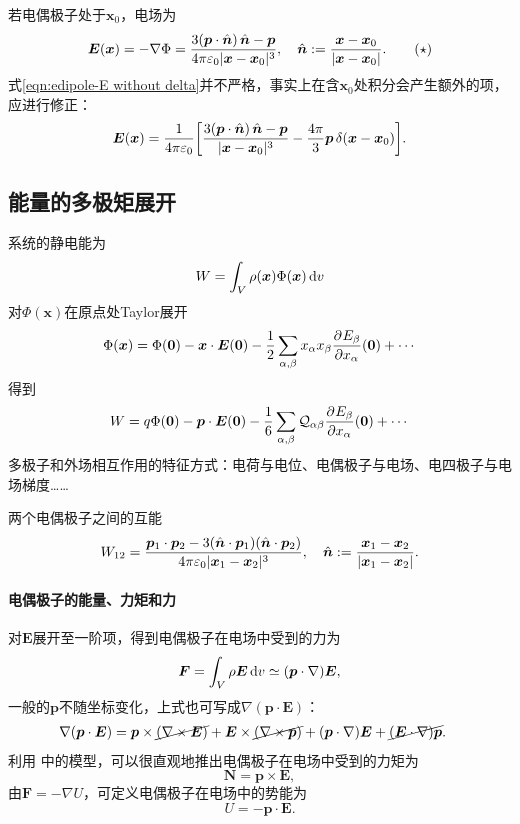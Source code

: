 若电偶极子处于$\bm x_0$，电场为 
\begin{equation}
    \label{eqn:edipole-E without delta}
    \bm E(\bm x)=-\nabla\Phi=\frac{3(\bm p\cdot\mathop{}\!\hat{\bm{n}})\mathop{}\!\hat{\bm{n}}-\bm p}{4\pi\varepsilon_0|\bm x-\bm x_0|^3},\quad \mathop{}\!\hat{\bm{n}}:=\frac{\bm x-\bm x_0}{|\bm x-\bm x_0|}.
    \tag{$\star$}
\end{equation}
式\eqref{eqn:edipole-E without delta}并不严格，事实上在含$\bm x_0$处积分会产生额外的项，应进行修正：
\begin{equation}
    \label{eqn:edipole-E with delta}
    \bm E(\bm x)=\frac1{4\pi\varepsilon_0}\biggl[\frac{3(\bm p\cdot\mathop{}\!\hat{\bm{n}})\mathop{}\!\hat{\bm{n}}-\bm p}{|\bm x-\bm x_0|^3}-\frac{4\pi}3\bm p\mathop{}\!\delta(\bm x-\bm x_0)\biggr].
\end{equation}

\subsection{能量的多极矩展开}
\label{ssec:multipole expansion of energy}

系统的静电能为
\[
    W=\int_V\rho(\bm x)\Phi(\bm x)\mathop{}\!\mathrm{d} v
\]
对$\Phi(\bm x)$在原点处Taylor展开
\[
    \Phi(\bm x)=\Phi(\bm 0)-\bm x\cdot\bm E(\bm 0)-\frac12\sum_{\alpha,\beta}x_\alpha x_\beta\frac{\partial^{{}}E_\beta}{\partial{x_\alpha}^{{}}}(\bm 0)+\cdots
\]
得到 
\begin{equation}
    W=q\Phi(\bm 0)-\bm p\cdot\bm E(\bm 0)-\frac16\sum_{\alpha,\beta}\mathcal Q_{\alpha\beta}\frac{\partial^{{}}E_\beta}{\partial{x_\alpha}^{{}}}(\bm 0)+\cdots
\end{equation}
多极子和外场相互作用的特征方式：电荷与电位、电偶极子与电场、电四极子与电场梯度……

两个电偶极子之间的互能
\begin{equation}
    W_{12}=\frac{\bm p_1\cdot\bm p_2-3(\mathop{}\!\hat{\bm{n}}\cdot\bm p_1)(\mathop{}\!\hat{\bm{n}}\cdot\bm p_2)}{4\pi\varepsilon_0|\bm x_1-\bm x_2|^3},\quad\mathop{}\!\hat{\bm{n}}:=\frac{\bm x_1-\bm x_2}{|\bm x_1-\bm x_2|}.
\end{equation}
\paragraph{电偶极子的能量、力矩和力}对$\bm E$展开至一阶项，得到电偶极子在电场中受到的力为
\begin{equation}
    \bm F=\int_V\rho\bm E\mathop{}\!\mathrm{d} v\simeq(\bm p\cdot\nabla)\bm E,
\end{equation}
一般的$\bm p$不随坐标变化，上式也可写成$\nabla(\bm p\cdot\bm E)$： 
\begin{align*}
    \nabla(\bm p\cdot\bm E)&=\bm p\times\cancel{(\nabla\times\bm E)}+\bm E\times\cancel{(\nabla\times\bm p)}+(\bm p\cdot\nabla)\bm E+\cancel{(\bm E\cdot\nabla)\bm p}.
\end{align*}
利用 中的模型，可以很直观地推出电偶极子在电场中受到的力矩为
\begin{equation}
    \bm N=\bm p\times\bm E,
\end{equation}
由$\bm F=-\nabla U$，可定义电偶极子在电场中的势能为
\begin{equation}
    U=-\bm p\cdot\bm E.
\end{equation}

